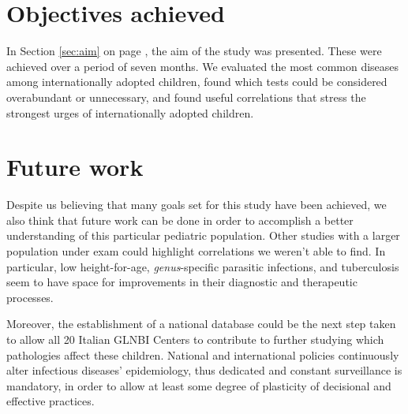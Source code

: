 \section{Objectives achieved}\label{secd:objectivesachieved}
In Section \ref{sec:aim} on page \pageref{sec:aim}, the aim of the study was presented. These were achieved over a period of seven months. We evaluated the most common diseases among internationally adopted children, found which tests could be considered overabundant or unnecessary, and found useful correlations that stress the strongest urges of internationally adopted children.

\section{Future work}\label{sec:futurework}
Despite us believing that many goals set for this study have been achieved, we also think that future work can be done in order to accomplish a better understanding of this particular pediatric population. Other studies with a larger population under exam could highlight correlations we weren't able to find. In particular, low height-for-age, \textit{genus}-specific parasitic infections, and tuberculosis seem to have space for improvements in their diagnostic and therapeutic processes.

Moreover, the establishment of a national database could be the next step taken to allow all 20 Italian GLNBI Centers to contribute to further studying which pathologies affect these children. National and international policies continuously alter infectious diseases' epidemiology, thus dedicated and constant surveillance is mandatory, in order to allow at least some degree of plasticity of decisional and effective practices.